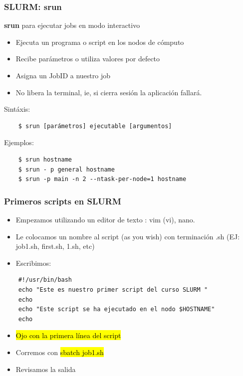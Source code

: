 \documentclass[aspectratio=169,professionalfonts]{beamer}
\begin{document}
\begin{frame}[fragile]
\frametitle{\textbf{SLURM: srun}}
\textbf{srun} para ejecutar jobs en modo interactivo 
\begin{itemize}
    \item Ejecuta un programa o script en los nodos de cómputo
    \item Recibe parámetros o utiliza valores por defecto
    \item Asigna un JobID  a nuestro job
    \item No libera la terminal, ie, si cierra sesión la aplicación fallará. 
\end{itemize}
    Sintáxis: 
\begin{verbatim}
    $ srun [parámetros] ejecutable [argumentos]
\end{verbatim}

   
    Ejemplos: 

\begin{verbatim}
    $ srun hostname
    $ srun - p general hostname
    $ srun -p main -n 2 --ntask-per-node=1 hostname
\end{verbatim}
 
\end{frame}


\begin{frame}[fragile]
\frametitle{\textbf{Primeros scripts en SLURM}}
\begin{itemize}
    \item Empezamos utilizando un editor de texto : vim (vi), nano. 
    \item Le colocamos un nombre al script (as you wish) con terminación .sh (EJ: job1.sh, first.sh, 1.sh, etc)
    \item Escribimos:
\end{itemize}

\begin{verbatim}
    #!/usr/bin/bash
    echo "Este es nuestro primer script del curso SLURM "
    echo
    echo "Este script se ha ejecutado en el nodo $HOSTNAME"
    echo 
\end{verbatim}


    \begin{itemize}
        \item \hl{Ojo con la primera línea del script}
        \item Corremos con \hl{sbatch job1.sh}
        \item Revisamos la salida 
    \end{itemize}
    \end{frame}
\end{document}
